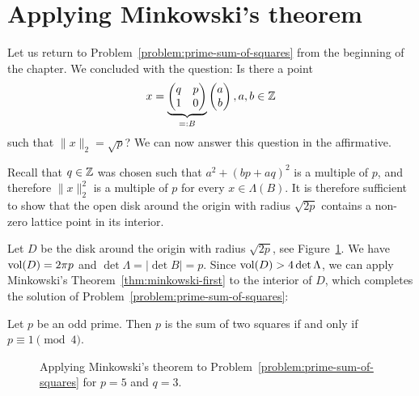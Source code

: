 \section{Applying Minkowski's theorem}

Let us return to Problem~\ref{problem:prime-sum-of-squares} from the beginning of the chapter.
We concluded with the question: Is there a point
\[
  x =
  \underbrace{\begin{pmatrix}
    q & p \\
    1 & 0
  \end{pmatrix}}_{=: B}
  \begin{pmatrix}
    a \\ b
  \end{pmatrix},
  a, b \in \mathbb{Z}
\]
such that $\|x\|_2 = \sqrt{p}$?
We can now answer this question in the affirmative.

Recall that $q \in \mathbb{Z}$ was chosen such that $a^2 + (bp + aq)^2$ is a multiple of $p$,
and therefore $\|x\|_2^2$ is a multiple of $p$ for every $x \in \Lambda(B)$.
It is therefore sufficient to show that the open disk around the origin with radius $\sqrt{2p}$
contains a non-zero lattice point in its interior.

Let $D$ be the disk around the origin with radius $\sqrt{2p}$, see Figure~\ref{fig:prime-sum-of-squares}.
We have $\operatorname{vol}(D) = 2\pi p$ and $\det \Lambda = |\det B| = p$.
Since $\operatorname{vol}(D) > 4 \det \Lambda$,
we can apply Minkowski's Theorem~\ref{thm:minkowski-first}
to the interior of $D$,
which completes the solution of Problem~\ref{problem:prime-sum-of-squares}:
\begin{theorem}
  Let $p$ be an odd prime.
  Then $p$ is the sum of two squares if and only if $p \equiv 1 \pmod{4}$.
\end{theorem}

\begin{figure}
  \begin{center}
  \end{center}
  \caption{Applying Minkowski's theorem to Problem~\ref{problem:prime-sum-of-squares} for $p = 5$ and $q = 3$.}
  \label{fig:prime-sum-of-squares}
\end{figure}



